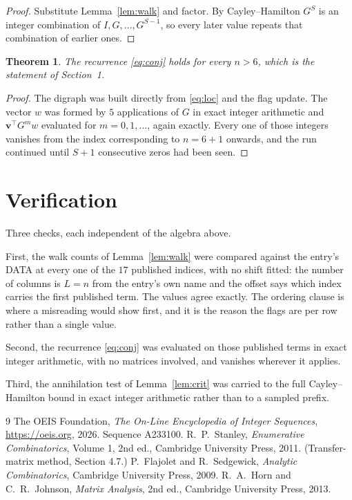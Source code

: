 \documentclass[11pt,a4paper]{article}
\theoremstyle{plain}
\newtheorem{theorem}{Theorem}
\theoremstyle{definition}
\begin{document}
\begin{proof}
Substitute Lemma~\ref{lem:walk} and factor. By Cayley--Hamilton $G^{S}$ is an integer
combination of $I,G,\dots,G^{S-1}$, so every later value repeats that combination of earlier
ones.
\end{proof}

\begin{theorem}
The recurrence \eqref{eq:conj} holds for every $n>6$, which is the statement of
Section~1.
\end{theorem}

\begin{proof}
The digraph was built directly from \eqref{eq:loc} and the flag update. The vector $w$ was
formed by $5$ applications of $G$ in exact integer arithmetic and
$\mathbf{v}^{\!\top}G^{m}w$ evaluated for $m=0,1,\dots$, again exactly. Every one of
those integers vanishes from the index corresponding to $n=6+1$ onwards, and the run
continued until $S+1$ consecutive zeros had been seen.
\end{proof}

\section{Verification}

Three checks, each independent of the algebra above.

First, the walk counts of Lemma~\ref{lem:walk} were compared against the entry's DATA at
every one of the $17$ published indices, with no shift fitted: the number of columns is
$L=n$ from the entry's own name and the offset says which index carries the first
published term. The values agree exactly. The ordering clause is where a misreading would
show first, and it is the reason the flags are per row rather than a single value.

Second, the recurrence \eqref{eq:conj} was evaluated on those published terms in exact
integer arithmetic, with no matrices involved, and vanishes wherever it applies.

Third, the annihilation test of Lemma~\ref{lem:crit} was carried to the full
Cayley--Hamilton bound in exact integer arithmetic rather than to a sampled prefix.

\begin{thebibliography}{9}
 The OEIS Foundation, \emph{The On-Line Encyclopedia of Integer
Sequences}, \url{https://oeis.org}, 2026. Sequence A233100.
 R.~P.~Stanley, \emph{Enumerative Combinatorics}, Volume 1, 2nd ed.,
Cambridge University Press, 2011. (Transfer-matrix method, Section 4.7.)
 P.~Flajolet and R.~Sedgewick, \emph{Analytic Combinatorics}, Cambridge
University Press, 2009.
 R.~A.~Horn and C.~R.~Johnson, \emph{Matrix Analysis}, 2nd ed., Cambridge
University Press, 2013.
\end{thebibliography}
\end{document}
